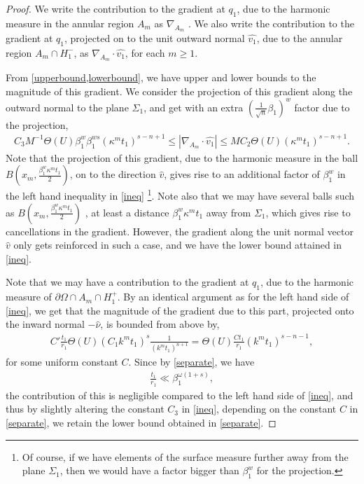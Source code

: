 \documentclass{article}
\newcounter{lem}
\theoremstyle{plain}
\theoremstyle{plain}
\newcommand{\en}{\beta_1}
\theoremstyle{definition}
\theoremstyle{plain}
\newcommand{\proj}{\nabla_{A_{m}}\cdot \hat{v_1} }
\begin{document}
\begin{proof}
We write the contribution to the gradient at $q_1$, due to the harmonic measure in the annular region $A_m$ as $\nabla_{A_{m}}$ . We also write the contribution to the gradient at $q_1$, projected on to the unit outward normal $\hat{v_1}$, due to the annular region $A_m\cap H^{-}_{1}$, as $\proj  $, for each $m\geq 1$. 

From \cref{upperbound,lowerbound}, we have upper and lower bounds to the magnitude of this gradient. We consider the projection of this gradient along the outward normal to the plane $\Sigma_1$, and get with an extra $(\frac{1}{\sqrt{n}}\en)^w$ factor due to the projection, 
\begin{align}\label{ineq}
          C_{3}M^{-1}\Theta(U)\beta_1^{w}\beta_1^{ws} (\kappa^m t_1)^{s-n+1} \leq |\proj| \leq MC_{2}\Theta(U) (\kappa^{m} t_{1})^{s-n+1}.
\end{align}
Note that the projection of this gradient, due to the harmonic measure in the ball $B(x_m, \frac{\beta_1^w\kappa^m t_1}{2})$, on to the direction $\hat{v}$, gives rise to an additional factor of $\beta_1^w$ in the left hand inequality in \cref{ineq} \footnote{Of course, if we have elements of the surface measure further away from the plane $\Sigma_1$, then we would have a factor bigger than $\beta_1^w$ for the projection. }. Note also that we may have several balls such as $B(x_m, \frac{\beta_1^w\kappa^m t_1}{2})$ , at least a distance $\beta_1^w \kappa^m t_1$ away from $\Sigma_1$, which gives rise to cancellations in the gradient. However, the gradient along the unit normal vector $\hat{v}$ only gets reinforced in such a case, and we have the lower bound attained in \cref{ineq}. 

Note that we may have a contribution to the gradient at $q_1$, due to the harmonic measure of
$\partial \Omega \cap A_m \cap H_1^+$.
By an identical argument as for the left hand side of \eqref{ineq}, we get that the magnitude of the gradient
due to this part, projected onto the inward normal $-\hat{\nu}$, is bounded from above by,
\begin{align}\label{eq43}
 C' \frac{t_1}{r_1} \Theta(U) (C_1 k^m t_1)^{s} \frac{1}{(k^m t_1)^{n+1}}
= \Theta(U) \frac{C t_1}{r_1} (k^m t_1)^{s-n-1},
\end{align}
for some uniform constant $C$.
Since by \eqref{separate}, we have
\begin{align}
\frac{t_1}{r_1} \ll \beta_1^{\omega(1+s)},
\end{align}
the contribution of this is negligible compared to the left hand side of \eqref{ineq}, and thus by slightly
altering the constant $C_3$ in \eqref{ineq}, depending on the constant $C$ in \eqref{separate}, we retain
the lower bound obtained in \eqref{separate}.


\end{proof}
\end{document}

